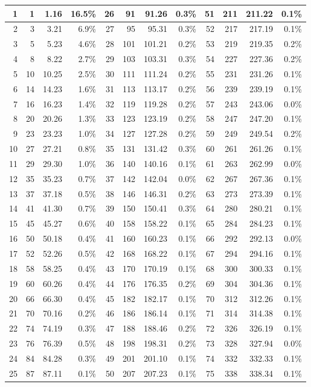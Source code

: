 \documentclass[12pt]{article}
\begin{document}
\begin{table}[h]
\begin{tabular}{|r|r|r|r|r|r|r|r|r|r|r|r|}
1 & 1 & 1.16 & 16.5\% & 26 & 91 & 91.26 & 0.3\% & 51 & 211 & 211.22 & 0.1\% \\ \hline
2 & 3 & 3.21 & 6.9\% & 27 & 95 & 95.31 & 0.3\% & 52 & 217 & 217.19 & 0.1\% \\ \hline
3 & 5 & 5.23 & 4.6\% & 28 & 101 & 101.21 & 0.2\% & 53 & 219 & 219.35 & 0.2\% \\ \hline
4 & 8 & 8.22 & 2.7\% & 29 & 103 & 103.31 & 0.3\% & 54 & 227 & 227.36 & 0.2\% \\ \hline
5 & 10 & 10.25 & 2.5\% & 30 & 111 & 111.24 & 0.2\% & 55 & 231 & 231.26 & 0.1\% \\ \hline
6 & 14 & 14.23 & 1.6\% & 31 & 113 & 113.17 & 0.2\% & 56 & 239 & 239.19 & 0.1\% \\ \hline
7 & 16 & 16.23 & 1.4\% & 32 & 119 & 119.28 & 0.2\% & 57 & 243 & 243.06 & 0.0\% \\ \hline
8 & 20 & 20.26 & 1.3\% & 33 & 123 & 123.19 & 0.2\% & 58 & 247 & 247.20 & 0.1\% \\ \hline
9 & 23 & 23.23 & 1.0\% & 34 & 127 & 127.28 & 0.2\% & 59 & 249 & 249.54 & 0.2\% \\ \hline
10 & 27 & 27.21 & 0.8\% & 35 & 131 & 131.42 & 0.3\% & 60 & 261 & 261.26 & 0.1\% \\ \hline
11 & 29 & 29.30 & 1.0\% & 36 & 140 & 140.16 & 0.1\% & 61 & 263 & 262.99 & 0.0\% \\ \hline
12 & 35 & 35.23 & 0.7\% & 37 & 142 & 142.04 & 0.0\% & 62 & 267 & 267.36 & 0.1\% \\ \hline
13 & 37 & 37.18 & 0.5\% & 38 & 146 & 146.31 & 0.2\% & 63 & 273 & 273.39 & 0.1\% \\ \hline
14 & 41 & 41.30 & 0.7\% & 39 & 150 & 150.41 & 0.3\% & 64 & 280 & 280.21 & 0.1\% \\ \hline
15 & 45 & 45.27 & 0.6\% & 40 & 158 & 158.22 & 0.1\% & 65 & 284 & 284.23 & 0.1\% \\ \hline
16 & 50 & 50.18 & 0.4\% & 41 & 160 & 160.23 & 0.1\% & 66 & 292 & 292.13 & 0.0\% \\ \hline
17 & 52 & 52.26 & 0.5\% & 42 & 168 & 168.22 & 0.1\% & 67 & 294 & 294.16 & 0.1\% \\ \hline
18 & 58 & 58.25 & 0.4\% & 43 & 170 & 170.19 & 0.1\% & 68 & 300 & 300.33 & 0.1\% \\ \hline
19 & 60 & 60.26 & 0.4\% & 44 & 176 & 176.35 & 0.2\% & 69 & 304 & 304.36 & 0.1\% \\ \hline
20 & 66 & 66.30 & 0.4\% & 45 & 182 & 182.17 & 0.1\% & 70 & 312 & 312.26 & 0.1\% \\ \hline
21 & 70 & 70.16 & 0.2\% & 46 & 186 & 186.14 & 0.1\% & 71 & 314 & 314.38 & 0.1\% \\ \hline
22 & 74 & 74.19 & 0.3\% & 47 & 188 & 188.46 & 0.2\% & 72 & 326 & 326.19 & 0.1\% \\ \hline
23 & 76 & 76.39 & 0.5\% & 48 & 198 & 198.31 & 0.2\% & 73 & 328 & 327.94 & 0.0\% \\ \hline
24 & 84 & 84.28 & 0.3\% & 49 & 201 & 201.10 & 0.1\% & 74 & 332 & 332.33 & 0.1\% \\ \hline
25 & 87 & 87.11 & 0.1\% & 50 & 207 & 207.23 & 0.1\% & 75 & 338 & 338.34 & 0.1\% \\ \hline


\end{tabular}
\end{table}
\end{document}
